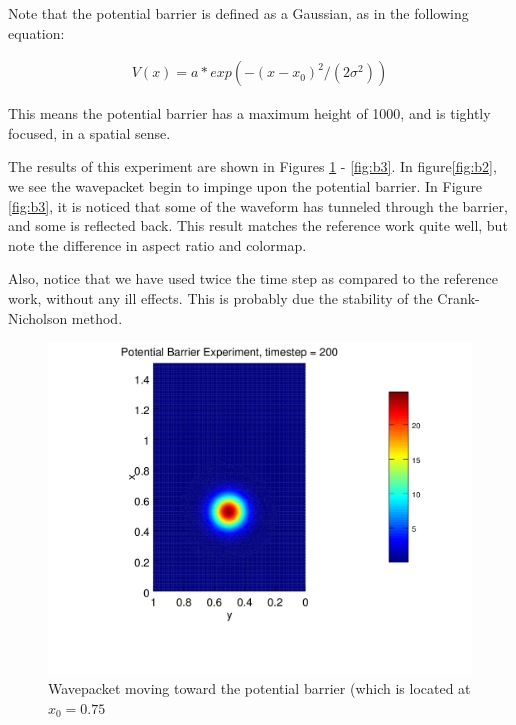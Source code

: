 \documentclass[letterpaper,12pt]{article}
\begin{document}
Note that the potential barrier is defined as a Gaussian, as in the following equation:

\begin{equation}
\begin{split}
V(x) = a*exp( -(x-x_0)^2 / (2\sigma^2) )
\end{split}
\end{equation}

This means the potential barrier has a maximum height of 1000, and is tightly focused, in a spatial sense.

The results of this experiment are shown in Figures \ref{fig:b1} - \ref{fig:b3}.  In figure\ref{fig:b2}, we see the wavepacket begin to impinge upon the potential barrier.  In Figure \ref{fig:b3}, it is noticed that some of the waveform has tunneled through the barrier, and some is reflected back.  This result matches the reference work quite well, but note the difference in aspect ratio and colormap.

Also, notice that we have used twice the time step as compared to the reference work, without any ill effects.  This is probably due the stability of the Crank-Nicholson method.  


\begin{figure}[!htbp]
\centering
\includegraphics[scale=0.65,trim = 2mm 25mm 2mm 15mm]{barrier1.png}
\caption{Wavepacket moving toward the potential barrier (which is located at $x_0 = 0.75$ }
\label{fig:b1}
\end{figure}
\end{document}
